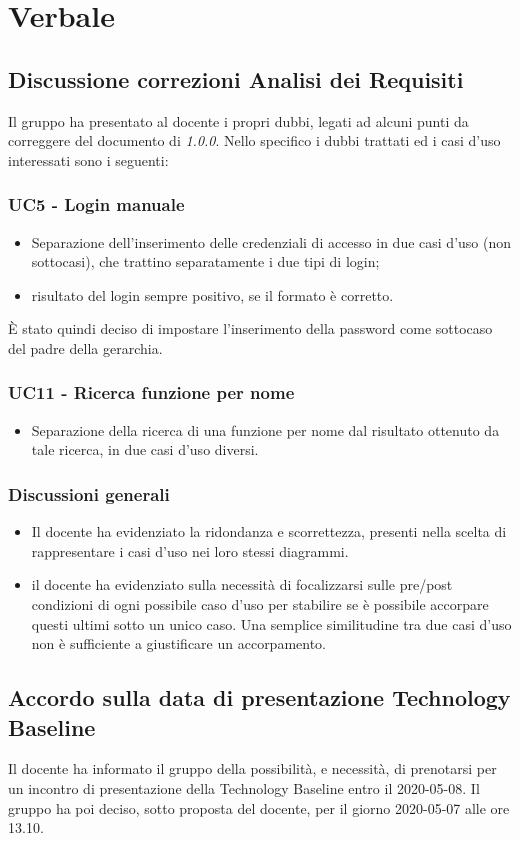 \section{Verbale}
\subsection{Discussione correzioni Analisi dei Requisiti}
Il gruppo ha presentato al docente i propri dubbi, legati ad alcuni punti da correggere del documento di \AdR{} \textit{1.0.0}.
Nello specifico i dubbi trattati ed i casi d'uso interessati sono i seguenti:
\subsubsection*{UC5 - Login manuale}
\begin{itemize}
	\item Separazione dell'inserimento delle credenziali di accesso in due casi d'uso (non sottocasi), che trattino separatamente i due tipi di login;
	\item risultato del login sempre positivo, se il formato è corretto.
\end{itemize}
È stato quindi deciso di impostare l'inserimento della password come sottocaso del padre della gerarchia.
\subsubsection*{UC11 - Ricerca funzione per nome}
\begin{itemize}
	\item Separazione della ricerca di una funzione per nome dal risultato ottenuto da tale ricerca, in due casi d'uso diversi.
\end{itemize}
\subsubsection*{Discussioni generali}
\begin{itemize}
	\item Il docente ha evidenziato la ridondanza e scorrettezza, presenti nella scelta di rappresentare i casi d'uso nei loro stessi diagrammi.
	\item il docente ha evidenziato sulla necessità di focalizzarsi sulle pre/post condizioni di ogni possibile caso d'uso per stabilire se è possibile accorpare questi ultimi sotto un unico caso. Una semplice similitudine tra due casi d'uso non è sufficiente a giustificare un accorpamento.
\end{itemize}

\subsection{Accordo sulla data di presentazione Technology Baseline}
Il docente ha informato il gruppo della possibilità, e necessità, di prenotarsi per un incontro di presentazione della Technology Baseline entro il 2020-05-08. Il gruppo ha poi deciso, sotto proposta del docente, per il giorno 2020-05-07 alle ore 13.10.

